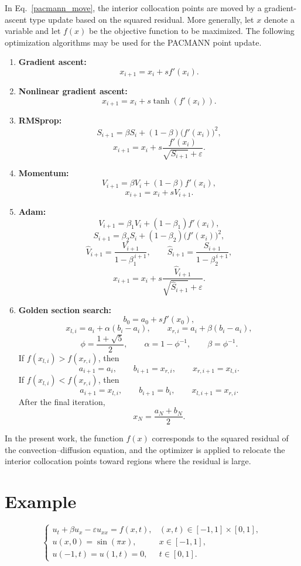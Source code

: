 \documentclass[10pt,reqno]{article}
\numberwithin{equation}{section}
\begin{document}
In Eq.~\eqref{pacmann_move}, the interior collocation points are moved by a gradient-ascent type update based on the squared residual. More generally, let $x$ denote a variable and let $f(x)$ be the objective function to be maximized. The following optimization algorithms may be used for the PACMANN point update.
\begin{enumerate}
\item \textbf{Gradient ascent:}
\[
x_{i+1} = x_i + s f'(x_i).
\]

\item \textbf{Nonlinear gradient ascent:}
\[
x_{i+1} = x_i + s \tanh\!\left(f'(x_i)\right).
\]

\item \textbf{RMSprop:}
\[
S_{i+1} = \beta S_i + (1-\beta)\bigl(f'(x_i)\bigr)^2,
\]
\[
x_{i+1} = x_i + s \frac{f'(x_i)}{\sqrt{S_{i+1}}+\varepsilon}.
\]

\item \textbf{Momentum:}
\[
V_{i+1} = \beta V_i + (1-\beta)f'(x_i),
\]
\[
x_{i+1} = x_i + s V_{i+1}.
\]

\item \textbf{Adam:}
\[
V_{i+1} = \beta_1 V_i + (1-\beta_1)f'(x_i),
\]
\[
S_{i+1} = \beta_2 S_i + (1-\beta_2)\bigl(f'(x_i)\bigr)^2,
\]
\[
\hat{V}_{i+1} = \frac{V_{i+1}}{1-\beta_1^{\,i+1}},
\qquad
\hat{S}_{i+1} = \frac{S_{i+1}}{1-\beta_2^{\,i+1}},
\]
\[
x_{i+1} = x_i + s \frac{\hat{V}_{i+1}}{\sqrt{\hat{S}_{i+1}}+\varepsilon}.
\]

\item \textbf{Golden section search:}
\[
b_0 = a_0 + s f'(x_0),
\]
\[
x_{l,i} = a_i + \alpha (b_i-a_i),
\qquad
x_{r,i} = a_i + \beta (b_i-a_i),
\]
\[
\phi = \frac{1+\sqrt{5}}{2},
\qquad
\alpha = 1-\phi^{-1},
\qquad
\beta = \phi^{-1}.
\]
If $f(x_{l,i}) > f(x_{r,i})$, then
\[
a_{i+1} = a_i,
\qquad
b_{i+1} = x_{r,i},
\qquad
x_{r,i+1} = x_{l,i}.
\]
If $f(x_{l,i}) < f(x_{r,i})$, then
\[
a_{i+1} = x_{l,i},
\qquad
b_{i+1} = b_i,
\qquad
x_{l,i+1} = x_{r,i}.
\]
After the final iteration,
\[
x_N = \frac{a_N+b_N}{2}.
\]
\end{enumerate}
In the present work, the function $f(x)$ corresponds to the squared residual of the convection--diffusion equation, and the optimizer is applied to relocate the interior collocation points toward regions where the residual is large.
\section*{Example}
\begin{equation}
\label{eq:model_problem}
\begin{cases}
u_t + \beta u_x - \varepsilon u_{xx} = f(x,t), & (x,t)\in[-1,1]\times[0,1], \\[2mm]
u(x,0)=\sin(\pi x), & x\in[-1,1], \\[2mm]
u(-1,t)=u(1,t)=0, & t\in[0,1].
\end{cases}
\end{equation}
\end{document}

